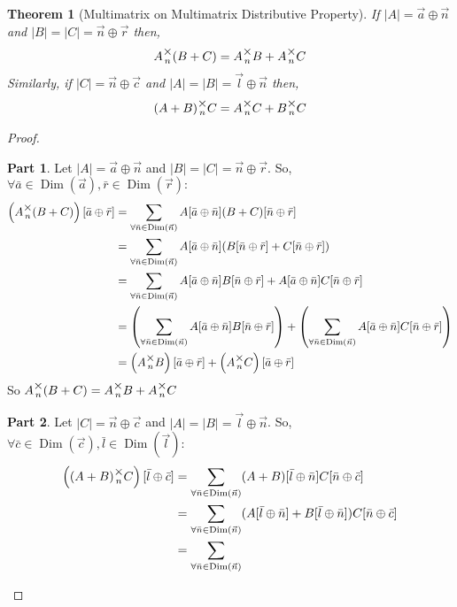 \documentclass[12pt]{book}
\theoremstyle{plain}
\newtheorem{theorem}{Theorem}[chapter]
\theoremstyle{definition}
\theoremstyle{ppart}
\newtheorem{ppart}{Part}
\theoremstyle{case}
\theoremstyle{solution}
\DeclareMathOperator{\Dim}{Dim}
\newcommand{\mmult}[1]{\text{\raisebox{1ex}{$\underset{#1}{\times}$}}}
\begin{document}
\begin{landscape}
\begin{theorem}[Multimatrix on Multimatrix Distributive Property]
If $|A| = \vec{a} \oplus \vec{n}$ and $|B|=|C|=\vec{n} \oplus \vec{r}$ then,
\[ A \mmult{n} (B + C) = A \mmult{n} B + A \mmult{n} C \]
Similarly, if $|C| = \vec{n} \oplus \vec{c}$ and $|A|=|B|=\vec{l} \oplus \vec{n}$ then,
\[ (A + B) \mmult{n} C = A \mmult{n} C + B \mmult{n} C \]
\end{theorem}
\begin{proof}
\begin{ppart}
Let $|A| = \vec{a} \oplus \vec{n}$ and $|B|=|C|=\vec{n} \oplus \vec{r}$.
So, $\forall \bar{a} \in \Dim(\vec{a}), \bar{r} \in \Dim(\vec{r}) :$
\begin{align*}
 \left( A \mmult{n} (B + C) \right)[\bar{a} \oplus \bar{r}]
 &= \sum_{\forall \bar{n} \in \Dim(\vec{n})}
    A[\bar{a} \oplus \bar{n}] (B + C)[\bar{n} \oplus \bar{r}] \\
 &= \sum_{\forall \bar{n} \in \Dim(\vec{n})}
    A[\bar{a} \oplus \bar{n}] (B[\bar{n} \oplus \bar{r}] + C[\bar{n} \oplus \bar{r}]) \\
 &= \sum_{\forall \bar{n} \in \Dim(\vec{n})}
    A[\bar{a} \oplus \bar{n}] B[\bar{n} \oplus \bar{r}]
  + A[\bar{a} \oplus \bar{n}]C[\bar{n} \oplus \bar{r}] \\
 &= \left( \sum_{\forall \bar{n} \in \Dim(\vec{n})}
    A[\bar{a} \oplus \bar{n}] B[\bar{n} \oplus \bar{r}] \right)
    +
    \left( \sum_{\forall \bar{n} \in \Dim(\vec{n})}
    A[\bar{a} \oplus \bar{n}]C[\bar{n} \oplus \bar{r}] \right) \\
 &= \left( A \mmult{n} B \right)[\bar{a} \oplus \bar{r}] +
     \left( A \mmult{n} C \right)[\bar{a} \oplus \bar{r}]
\end{align*}
So $A \mmult{n} (B + C) = A \mmult{n} B + A \mmult{n} C$
\end{ppart}
\begin{ppart}
Let $|C| = \vec{n} \oplus \vec{c}$ and $|A|=|B|=\vec{l} \oplus \vec{n}$.
So, $\forall \bar{c} \in \Dim(\vec{c}), \bar{l} \in \Dim(\vec{l}) :$
\begin{align*}
 \left( (A + B) \mmult{n} C \right)[\bar{l} \oplus \bar{c}]
 &= \sum_{\forall \bar{n} \in \Dim(\vec{n})}
    (A+B)[\bar{l} \oplus \bar{n}] C[\bar{n} \oplus \bar{c}] \\
 &= \sum_{\forall \bar{n} \in \Dim(\vec{n})}
    (A[\bar{l} \oplus \bar{n}]+B[\bar{l} \oplus \bar{n}])C[\bar{n} \oplus \bar{c}] \\
 &= \sum_{\forall \bar{n} \in \Dim(\vec{n})}

\end{align*}
\end{ppart}
\end{proof}
\end{landscape}
\end{document}
